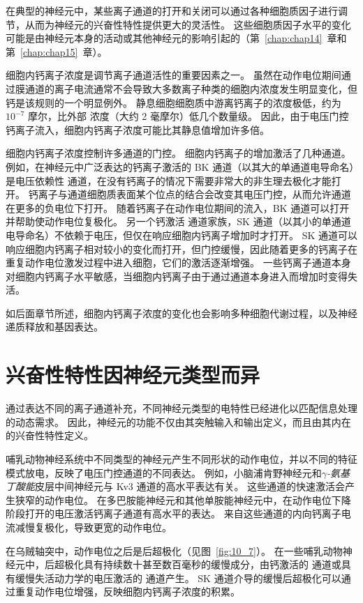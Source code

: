 在典型的神经元中，某些离子通道的打开和关闭可以通过各种细胞质因子进行调节，从而为神经元的兴奋性特性提供更大的灵活性。
这些细胞质因子水平的变化可能是由神经元本身的活动或其他神经元的影响引起的（第~\ref{chap:chap14}~章和第~\ref{chap:chap15}~章）。


细胞内钙离子浓度是调节离子通道活性的重要因素之一。
虽然在动作电位期间通过膜通道的离子电流通常不会导致大多数离子种类的细胞内浓度发生明显变化，但钙是该规则的一个明显例外。
静息细胞细胞质中游离钙离子的浓度极低，约为 $10^{-7}$ 摩尔，比外部  浓度（大约 2 毫摩尔）低几个数量级。 
因此，由于电压门控钙离子流入，细胞内钙离子浓度可能比其静息值增加许多倍。


细胞内钙离子浓度控制许多通道的门控。
细胞内钙离子的增加激活了几种通道。
例如，在神经元中广泛表达的钙离子激活的 BK 通道（以其大的单通道电导命名）是电压依赖性  通道，在没有钙离子的情况下需要非常大的非生理去极化才能打开。
钙离子与通道细胞质表面某个位点的结合会改变其电压门控，从而允许通道在更多的负电位下打开。
随着钙离子在动作电位期间的流入，BK 通道可以打开并帮助使动作电位复极化。
另一个钙激活  通道家族，SK 通道（以其小的单通道电导命名）不依赖于电压，但仅在响应细胞内钙离子增加时才打开。
SK 通道可以响应细胞内钙离子相对较小的变化而打开，但门控缓慢，因此随着更多的钙离子在重复动作电位激发过程中进入细胞，它们的激活逐渐增强。
一些钙离子通道本身对细胞内钙离子水平敏感，当细胞内钙离子由于通过通道本身进入而增加时变得失活。


如后面章节所述，细胞内钙离子浓度的变化也会影响多种细胞代谢过程，以及神经递质释放和基因表达。



\section{兴奋性特性因神经元类型而异}

通过表达不同的离子通道补充，不同神经元类型的电特性已经进化以匹配信息处理的动态需求。
因此，神经元的功能不仅由其突触输入和输出定义，而且由其内在的兴奋性特性定义。


哺乳动物神经系统中不同类型的神经元产生不同形状的动作电位，并以不同的特征模式放电，反映了电压门控通道的不同表达。
例如，小脑浦肯野神经元和\textit{$\gamma$-氨基丁酸能}皮层中间神经元与 Kv3 通道的高水平表达有关。
这些通道的快速激活会产生狭窄的动作电位。
在多巴胺能神经元和其他单胺能神经元中，在动作电位下降阶段打开的电压激活钙离子通道有高水平的表达。
来自这些通道的内向钙离子电流减慢复极化，导致更宽的动作电位。


在乌贼轴突中，动作电位之后是后超极化（见图~\ref{fig:10_7}）。
在一些哺乳动物神经元中，后超极化具有持续数十甚至数百毫秒的缓慢成分，由钙激活的  通道或具有缓慢失活动力学的电压激活的  通道产生。
SK 通道介导的缓慢后超极化可以通过重复动作电位增强，反映细胞内钙离子浓度的积累。


